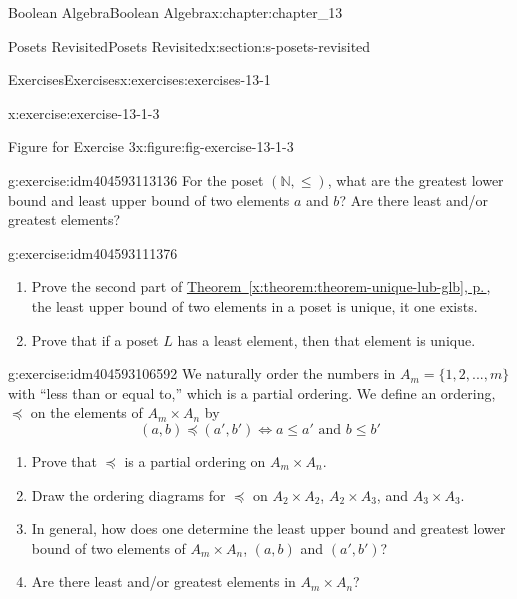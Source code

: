 \documentclass[twoside,10pt,]{book}
\newcommand{\xreffont}{\relax}
\numberwithin{equation}{section}
\begin{document}
\begin{chapterptx}{Boolean Algebra}{}{Boolean Algebra}{}{}{x:chapter:chapter_13}
\begin{sectionptx}{Posets Revisited}{}{Posets Revisited}{}{}{x:section:s-posets-revisited}
\begin{exercises-subsection}{Exercises}{}{Exercises}{}{}{x:exercises:exercises-13-1}
\begin{divisionexercise}{3}{}{}{x:exercise:exercise-13-1-3}
\begin{figureptx}{Figure for Exercise 3}{x:figure:fig-exercise-13-1-3}{}
\begin{image}{0.1}{0.8}{0.1}
\end{image}%
\tcblower
\end{figureptx}%
\end{divisionexercise}%
\begin{divisionexercise}{4}{}{}{g:exercise:idm404593113136}%
For the poset \((\mathbb{N},\leq )\), what are the greatest lower bound and least upper bound of two elements \(a\) and \(b\)? Are there least and\slash{}or greatest elements?%
\end{divisionexercise}%
\begin{divisionexercise}{5}{}{}{g:exercise:idm404593111376}%
%
\begin{enumerate}[label=(\alph*)]
\item{}Prove the second part of \hyperref[x:theorem:theorem-unique-lub-glb]{Theorem~{\xreffont\ref{x:theorem:theorem-unique-lub-glb}}, p.\,\pageref{x:theorem:theorem-unique-lub-glb}}, the least upper bound of two elements in a poset is unique, it one exists.%
\item{}Prove that if a poset \(L\) has a least element, then that element is unique.%
\end{enumerate}
%
\end{divisionexercise}%
\begin{divisionexercise}{6}{}{}{g:exercise:idm404593106592}%
We naturally order the numbers in \(A_m = \{1, 2, . . . , m\}\) with ``less than or equal to,'' which is a partial ordering. We define an ordering, \(\preceq\)  on the elements of \(A_m \times  A_n\) by%
\begin{equation*}
(a, b) \preceq  (a', b') \Leftrightarrow a \leq  a' \textrm{ and } b \leq  b'
\end{equation*}
%
\begin{enumerate}[label=(\alph*)]
\item{}Prove that \(\preceq\) is a partial ordering on \(A_m \times  A_n\).%
\item{}Draw the ordering diagrams for \(\preceq\) on \(A_2 \times  A_2\), \(A_2\times  A_3\), and \(A_3 \times  A_3\).%
\item{}In general, how does one determine the least upper bound  and greatest lower bound of two elements of \(A_m \times  A_n\), \((a, b)\) and \((a',b')\)?%
\item{}Are there least and\slash{}or greatest elements in \(A_m \times  A_n\)?%
\end{enumerate}
%
\end{divisionexercise}%
\end{exercises-subsection}

\end{sectionptx}
\end{chapterptx}
\end{document}
